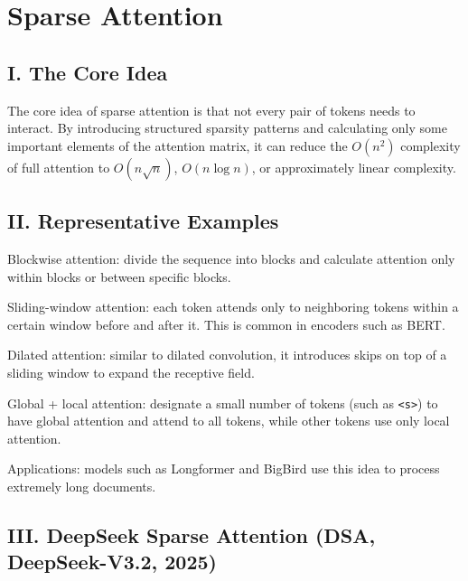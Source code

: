 \setcounter{section}{6}

\hypertarget{sparse-attention}{%
\section{Sparse Attention}\label{sparse-attention}}

\hypertarget{i.-the-core-idea-1}{%
\subsection{I. The Core Idea}\label{i.-the-core-idea-1}}

The core idea of sparse attention is that not every pair of tokens needs to interact. By introducing structured sparsity patterns and calculating only some important elements of the attention matrix, it can reduce the \(O(n^2)\) complexity of full attention to \(O(n\sqrt{n})\), \(O(n\log n)\), or approximately linear complexity.

\hypertarget{ii.-representative-examples}{%
\subsection{II. Representative Examples}\label{ii.-representative-examples}}

Blockwise attention: divide the sequence into blocks and calculate attention only within blocks or between specific blocks.

Sliding-window attention: each token attends only to neighboring tokens within a certain window before and after it. This is common in encoders such as BERT.

Dilated attention: similar to dilated convolution, it introduces skips on top of a sliding window to expand the receptive field.

Global + local attention: designate a small number of tokens (such as \texttt{\textless{}s\textgreater{}}) to have global attention and attend to all tokens, while other tokens use only local attention.

Applications: models such as Longformer and BigBird use this idea to process extremely long documents.

\hypertarget{iii.-deepseek-sparse-attention-dsa-deepseek-v3.2-2025}{%
\subsection{III. DeepSeek Sparse Attention (DSA, DeepSeek-V3.2, 2025)}\label{iii.-deepseek-sparse-attention-dsa-deepseek-v3.2-2025}}

